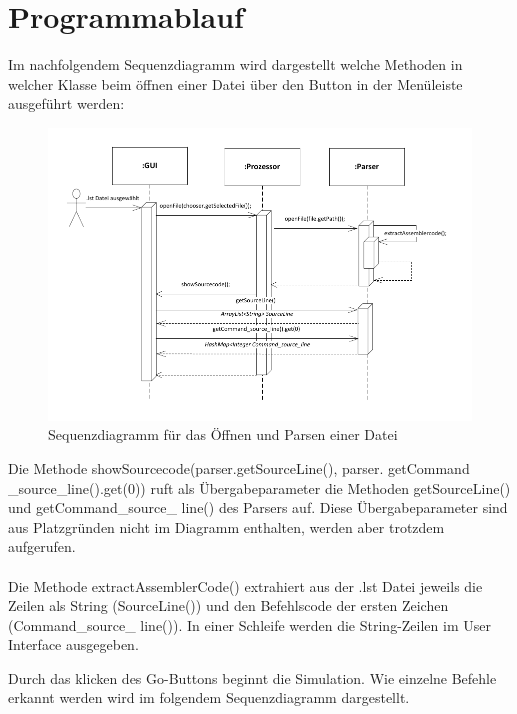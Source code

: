 \newpage
\section{Programmablauf}
Im nachfolgendem Sequenzdiagramm wird dargestellt welche Methoden in welcher Klasse beim \"offnen einer Datei \"uber den Button in der Men\"uleiste ausgef\"uhrt werden:

\begin{figure}[h]
\centering
\includegraphics[scale=1]{Bilder/SeqOff.pdf}
\caption{Sequenzdiagramm f\"ur das \"Offnen und Parsen einer Datei}
\end{figure}

\noindent Die Methode showSourcecode(parser.getSourceLine(),
 parser. getCommand\\\_source\_line().get(0)) ruft als \"Ubergabeparameter die Methoden getSourceLine() und getCommand\_source\_ line() des Parsers auf. Diese \"Ubergabeparameter sind aus Platzgr\"unden nicht im Diagramm enthalten, werden aber trotzdem aufgerufen.
\\
\\\noindent Die Methode extractAssemblerCode() extrahiert aus der .lst Datei jeweils die Zeilen als String (SourceLine()) und den Befehlscode der ersten Zeichen (Command\_source\_ line()). In einer Schleife werden die String-Zeilen im User Interface ausgegeben.
\newpage



\noindent Durch das klicken des Go-Buttons beginnt die Simulation. Wie einzelne Befehle erkannt werden wird im folgendem Sequenzdiagramm dargestellt.

